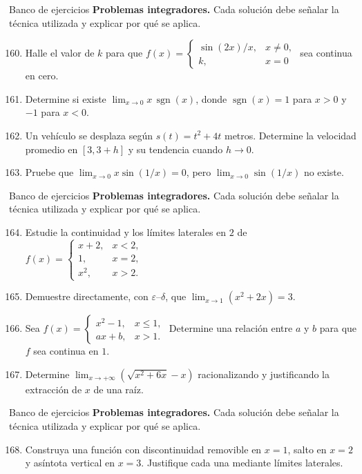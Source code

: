 \documentclass[12pt,aspectratio=169]{beamer}
\begin{document}
\begin{frame}[t,allowframebreaks]{Banco de ejercicios}
\small
\noindent \textbf{Problemas integradores.} Cada solución debe señalar la técnica utilizada y explicar por qué se aplica.\par\smallskip
\begin{enumerate}\setcounter{enumi}{159}
\item Halle el valor de $k$ para que $f(x)=\begin{cases}\sin(2x)/x,&x\ne0,\\k,&x=0\end{cases}$ sea continua en cero.
\item Determine si existe $\lim_{x\to0}x\,\operatorname{sgn}(x)$, donde $\operatorname{sgn}(x)=1$ para $x>0$ y $-1$ para $x<0$.
\item Un vehículo se desplaza según $s(t)=t^2+4t$ metros. Determine la velocidad promedio en $[3,3+h]$ y su tendencia cuando $h\to0$.
\item Pruebe que $\lim_{x\to0}x\sin(1/x)=0$, pero $\lim_{x\to0}\sin(1/x)$ no existe.
\end{enumerate}
\end{frame}


\begin{frame}[t,allowframebreaks]{Banco de ejercicios}
\small
\noindent \textbf{Problemas integradores.} Cada solución debe señalar la técnica utilizada y explicar por qué se aplica.\par\smallskip
\begin{enumerate}\setcounter{enumi}{163}
\item Estudie la continuidad y los límites laterales en $2$ de $f(x)=\begin{cases}x+2,&x<2,\\1,&x=2,\\x^2,&x>2.\end{cases}$
\item Demuestre directamente, con $\varepsilon$--$\delta$, que $\lim_{x\to1}(x^2+2x)=3$.
\item Sea $f(x)=\begin{cases}x^2-1,&x\le1,\\ax+b,&x>1.\end{cases}$ Determine una relación entre $a$ y $b$ para que $f$ sea continua en $1$.
\item Determine $\lim_{x\to+\infty}(\sqrt{x^2+6x}-x)$ racionalizando y justificando la extracción de $x$ de una raíz.
\end{enumerate}
\end{frame}


\begin{frame}[t,allowframebreaks]{Banco de ejercicios}
\small
\noindent \textbf{Problemas integradores.} Cada solución debe señalar la técnica utilizada y explicar por qué se aplica.\par\smallskip
\begin{enumerate}\setcounter{enumi}{167}
\item Construya una función con discontinuidad removible en $x=1$, salto en $x=2$ y asíntota vertical en $x=3$. Justifique cada una mediante límites laterales.
\end{enumerate}
\end{frame}
\end{document}
